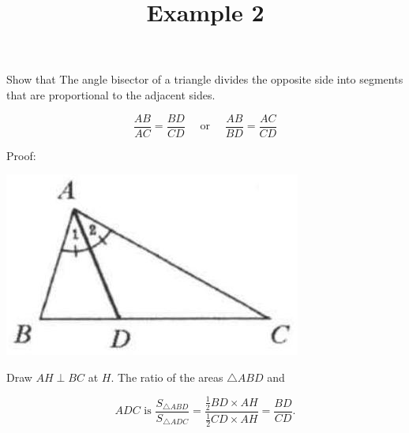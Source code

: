 \documentclass{article}
\title{Example 2}
\date{}
\begin{document}
\maketitle

Show that The angle bisector of a triangle divides the opposite side into segments that are proportional to the adjacent sides.

\[
\frac{A B}{A C}=\frac{B D}{C D} \quad \text { or } \quad \frac{A B}{B D}=\frac{A C}{C D}
\]

Proof:
\begin{center}
\includegraphics[width=\textwidth]{images/problem_image_1.jpg}
\end{center}

Draw \(A H \perp B C\) at \(H\). The ratio of the areas \(\triangle A B D\) and

\[
A D C \text { is } \frac{S_{\triangle A B D}}{S_{\triangle A D C}}=\frac{\frac{1}{2} B D \times A H}{\frac{1}{2} C D \times A H}=\frac{B D}{C D} .
\]
\end{document}
